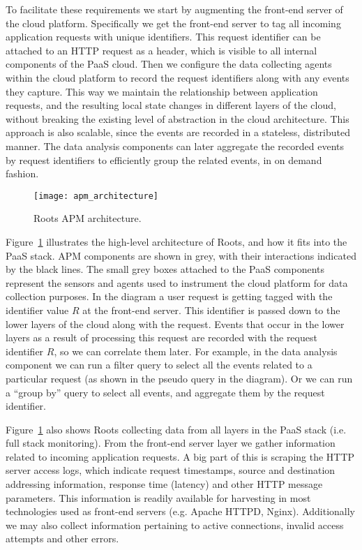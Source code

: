 To facilitate these requirements we start by augmenting the front-end server of the cloud platform. 
Specifically we get the front-end server to tag all incoming application requests with unique identifiers.
This request identifier can be attached to an HTTP request as a header, which is visible to all 
internal components of the PaaS cloud. Then we configure the data collecting agents within the 
cloud platform to record the request identifiers along with any events they capture. 
This way we maintain the relationship between application requests, and the resulting
local state changes in different layers of the cloud, without breaking the existing level
of abstraction in the cloud architecture. This approach is also scalable, since the events are
recorded in a stateless, distributed manner. The data analysis components can later
aggregate the recorded events by request identifiers to efficiently group the related events,
in on demand fashion.

\begin{figure}
\centering
\texttt{[image: apm\_architecture]}
\caption{Roots APM architecture.}
\label{fig:apm_architecture}
\end{figure}

Figure~\ref{fig:apm_architecture} illustrates the high-level architecture of Roots, and how 
it fits into the PaaS stack. APM components are shown in grey, with their interactions indicated
by the black lines. The small grey boxes attached to the PaaS components represent the sensors and
agents used to instrument the cloud platform for data collection purposes. 
In the diagram a user request is getting tagged with the identifier value
$R$ at the front-end server. This identifier is passed down to the lower layers of the cloud
along with the request. Events that occur in the lower layers as a result of processing this request
are recorded with the request identifier $R$, so we can correlate them later. For example, in the 
data analysis component we can run a filter query to select all the events related to a particular
request (as shown in the pseudo query in the diagram). Or we can run a ``group by'' 
query to select all events, and aggregate them by the request identifier.

Figure~\ref{fig:apm_architecture} also shows Roots collecting data from all layers in the 
PaaS stack (i.e. full stack monitoring). 
From the front-end server layer we gather information related to incoming application
requests. A big part of this is scraping the HTTP server access logs, which indicate request timestamps,
source and destination addressing information, response time (latency) and other HTTP message
parameters. This information is readily available for harvesting in most technologies used as front-end
servers (e.g. Apache HTTPD, Nginx). Additionally we may also collect information pertaining to active
connections, invalid access attempts and other errors.

